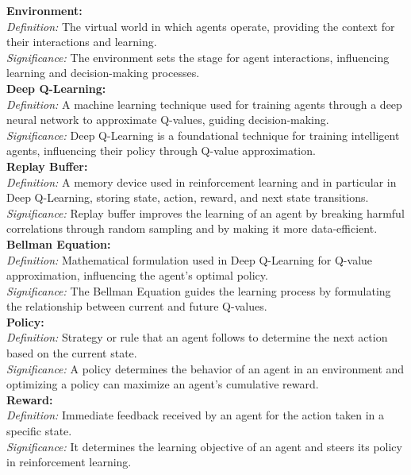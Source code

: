 \documentclass[12pt,a4paper,openright,twoside]{book}
\begin{document}
\textbf{Environment:}\\
\textit{Definition:} The virtual world in which agents operate, providing the context for their interactions and learning.\\
\textit{Significance:} The environment sets the stage for agent interactions, influencing learning and decision-making processes.\\

\textbf{Deep Q-Learning:}\\
\textit{Definition:} A machine learning technique used for training agents through a deep neural network to approximate Q-values, guiding decision-making.\\
\textit{Significance:} Deep Q-Learning is a foundational technique for training intelligent agents, influencing their policy through Q-value approximation.\\

\textbf{Replay Buffer:}\\
\textit{Definition:} A memory device used in reinforcement learning and in particular in Deep Q-Learning, storing state, action, reward, and next state transitions.\\
\textit{Significance:} Replay buffer improves the learning of an agent by breaking harmful correlations through random sampling and by making it more data-efficient.\\

\textbf{Bellman Equation:}\\
\textit{Definition:} Mathematical formulation used in Deep Q-Learning for Q-value approximation, influencing the agent's optimal policy.\\
\textit{Significance:} The Bellman Equation guides the learning process by formulating the relationship between current and future Q-values.\\

\textbf{Policy:}\\
\textit{Definition:} Strategy or rule that an agent follows to determine the next action based on the current state.\\
\textit{Significance:} A policy determines the behavior of an agent in an environment and optimizing a policy can maximize an agent's cumulative reward.\\

\textbf{Reward:}\\
\textit{Definition:} Immediate feedback received by an agent for the action taken in a specific state.\\
\textit{Significance:} It determines the learning objective of an agent and steers its policy in reinforcement learning.\\
\end{document}
